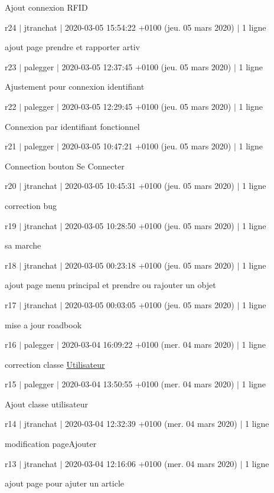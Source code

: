 Ajout connexion R\+F\+ID

r24 $\vert$ jtranchat $\vert$ 2020-\/03-\/05 15\+:54\+:22 +0100 (jeu. 05 mars 2020) $\vert$ 1 ligne

ajout page prendre et rapporter artiv

r23 $\vert$ palegger $\vert$ 2020-\/03-\/05 12\+:37\+:45 +0100 (jeu. 05 mars 2020) $\vert$ 1 ligne

Ajustement pour connexion identifiant

r22 $\vert$ palegger $\vert$ 2020-\/03-\/05 12\+:29\+:45 +0100 (jeu. 05 mars 2020) $\vert$ 1 ligne

Connexion par identifiant fonctionnel

r21 $\vert$ palegger $\vert$ 2020-\/03-\/05 10\+:47\+:21 +0100 (jeu. 05 mars 2020) $\vert$ 1 ligne

Connection bouton Se Connecter

r20 $\vert$ jtranchat $\vert$ 2020-\/03-\/05 10\+:45\+:31 +0100 (jeu. 05 mars 2020) $\vert$ 1 ligne

correction bug

r19 $\vert$ jtranchat $\vert$ 2020-\/03-\/05 10\+:28\+:50 +0100 (jeu. 05 mars 2020) $\vert$ 1 ligne

sa marche

r18 $\vert$ jtranchat $\vert$ 2020-\/03-\/05 00\+:23\+:18 +0100 (jeu. 05 mars 2020) $\vert$ 1 ligne

ajout page menu principal et prendre ou rajouter un objet

r17 $\vert$ jtranchat $\vert$ 2020-\/03-\/05 00\+:03\+:05 +0100 (jeu. 05 mars 2020) $\vert$ 1 ligne

mise a jour roadbook

r16 $\vert$ palegger $\vert$ 2020-\/03-\/04 16\+:09\+:22 +0100 (mer. 04 mars 2020) $\vert$ 1 ligne

correction classe \hyperlink{class_utilisateur}{Utilisateur}

r15 $\vert$ palegger $\vert$ 2020-\/03-\/04 13\+:50\+:55 +0100 (mer. 04 mars 2020) $\vert$ 1 ligne

Ajout classe utilisateur

r14 $\vert$ jtranchat $\vert$ 2020-\/03-\/04 12\+:32\+:39 +0100 (mer. 04 mars 2020) $\vert$ 1 ligne

modification page\+Ajouter

r13 $\vert$ jtranchat $\vert$ 2020-\/03-\/04 12\+:16\+:06 +0100 (mer. 04 mars 2020) $\vert$ 1 ligne

ajout page pour ajuter un article


